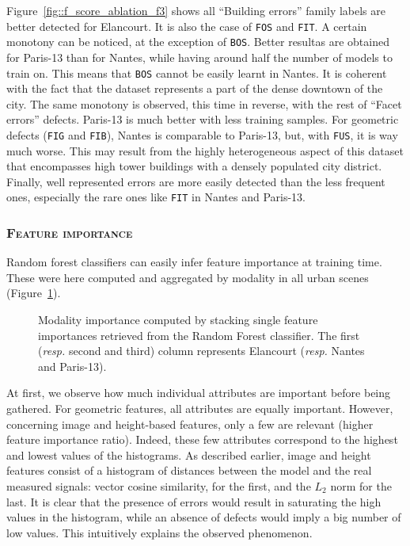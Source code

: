             Figure~\ref{fig::f_score_ablation_f3} shows all ``Building errors'' family labels are better detected for Elancourt.
            It is also the case of \texttt{FOS} and \texttt{FIT}. A certain monotony can be noticed, at the exception of \texttt{BOS}.
            Better resultas are obtained for Paris-13 than for Nantes, while having around half the number of models to train on.
            This means that \texttt{BOS} cannot be easily learnt in Nantes.
            It is coherent with the fact that the dataset represents a part of the dense downtown of the city.
            The same monotony is observed, this time in reverse, with the rest of ``Facet errors'' defects. Paris-13 is much better with less training samples.
            For geometric defects (\texttt{FIG} and \texttt{FIB}), Nantes is comparable to Paris-13, but, with \texttt{FUS}, it is way much worse.
            This may result from the highly heterogeneous aspect of this dataset that encompasses high tower buildings with a densely populated city district.
            Finally, well represented errors are more easily detected than the less frequent ones, especially the rare ones like \texttt{FIT} in Nantes and Paris-13.
        
        \subsubsection{\textsc{Feature importance}}
            Random forest classifiers can easily infer feature importance at training time.
            These were here computed and aggregated by modality in all urban scenes (Figure~\ref{fig::feature_importances}).

            \begin{figure}
                \centering
                
                \caption{
                    \label{fig::feature_importances} Modality importance computed by stacking single feature importances retrieved from the Random Forest classifier.
                    The first (\textit{resp.} second and third) column represents Elancourt (\textit{resp.} Nantes and Paris-13).
                }
            \end{figure}
            
            At first, we observe how much individual attributes are important before being gathered.
            For geometric features, all attributes are equally important.
            However, concerning image and height-based features, only a few are relevant (higher feature importance ratio).
            Indeed, these few attributes correspond to the highest and lowest values of the histograms.
            As described earlier, image and height features consist of a histogram of distances between the model and the real measured signals:
            vector cosine similarity, for the first, and the \(L_2\) norm for the last.
            It is clear that the presence of errors would result in saturating the high values in the histogram, while an absence of defects would imply a big number of low values.
            This intuitively explains the observed phenomenon.
            
